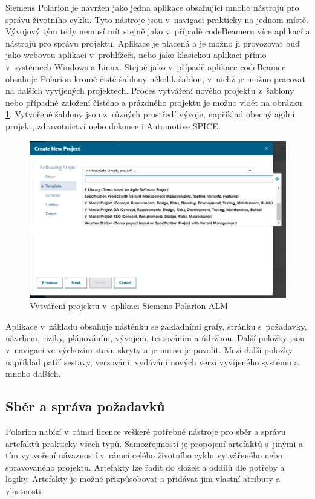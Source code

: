 \documentclass[czech,master]{diploma}
\begin{document}
Siemens Polarion je navržen jako jedna aplikace obsahující mnoho nástrojů pro správu životního cyklu. Tyto nástroje jsou v~navigaci prakticky na jednom místě. Vývojový tým tedy nemusí mít stejně jako v~případě codeBeameru více aplikací a nástrojů pro správu projektu. Aplikace je placená a je možno ji provozovat buď jako webovou aplikaci v~prohlížeči, nebo jako klasickou aplikaci přímo v~systémech Windows a Linux. Stejně jako v~případě aplikace codeBeamer obsahuje Polarion kromě čisté šablony několik šablon, v~nichž je možno pracovat na dalších vyvíjených projektech. Proces vytváření nového projektu z~šablony nebo případně založení čistého a prázdného projektu je možno vidět na obrázku \ref{fig:polarion_new_project}. Vytvořené šablony jsou z~různých prostředí vývoje, například obecný agilní projekt, zdravotnictví nebo dokonce i Automotive SPICE.


\begin{figure}[!ht]
    \centering
    \includegraphics[width=1\textwidth]{Diplomka/Figures/polarion_create_project.png}
    \caption{Vytváření projektu v~aplikaci Siemens Polarion ALM}
    \label{fig:polarion_new_project}
\end{figure}


Aplikace v~základu obsahuje nástěnku se základními grafy, stránku s~požadavky, návrhem, riziky, plánováním, vývojem, testováním a údržbou. Další položky jsou v~navigaci ve výchozím stavu skryty a je nutno je povolit. Mezi další položky například patří sestavy, verzování, vydávání nových verzí vyvíjeného systému a mnoho dalších.

\subsection{Sběr a správa požadavků}
Polarion nabízí v~rámci licence veškeré potřebné nástroje pro sběr a správu artefaktů prakticky všech typů. Samozřejmostí je propojení artefaktů s~jinými a tím vytvoření návazností v~rámci celého životního cyklu vytvářeného nebo spravovaného projektu. Artefakty lze řadit do složek a oddílů dle potřeby a logiky. Artefakty je možné přizpůsobovat a přidávat jim vlastní atributy a vlastnosti.
\end{document}
